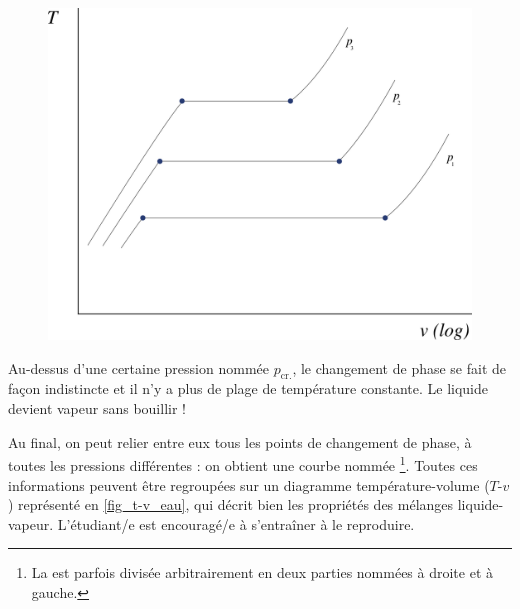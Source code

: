 		\begin{figure}
			\begin{center}
				\includegraphics[width=\didacticpvdiagramwidth]{images/tv_liquidevapeur_construction.png}
			\end{center}
			\label{fig_T-v_construction_2}
		\end{figure}

		Au-dessus d’une certaine pression nommée  $p_\text{cr.}$, le changement de phase se fait de façon indistincte et il n’y a plus de plage de température constante. Le liquide devient vapeur sans bouillir !

		Au final, on peut relier entre eux tous les points de changement de phase, à toutes les pressions différentes : on obtient une courbe nommée \footnote{La  est parfois divisée arbitrairement en deux parties nommées  à droite et  à gauche.}. Toutes ces informations peuvent être regroupées sur un diagramme température-volume ($T$-$v$) représenté en \cref{fig_t-v_eau}, qui décrit bien les propriétés des mélanges liquide-vapeur. L’étudiant/e est encouragé/e à s’entraîner à le reproduire.

